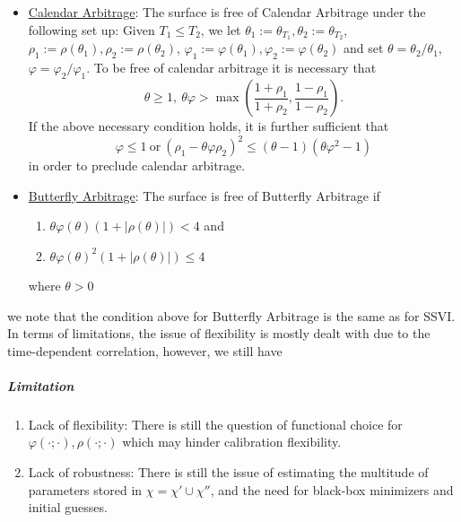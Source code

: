 \documentclass[11pt,letterpaper]{article}
\begin{document}
\begin{itemize}
\item \underline{Calendar Arbitrage}: The surface is free of Calendar Arbitrage under the following set up: Given $T_1 \leq T_2$, we let $\theta_1 := \theta_{T_1}, \theta_2 := \theta_{T_2}$, $\rho_1 := \rho(\theta_{1} ), \rho_2 := \rho(\theta_{2} )$, $\varphi_1 := \varphi(\theta_1), \varphi_2 := \varphi(\theta_2)$ and set $\theta = \theta_2/\theta_1$, $\varphi = \varphi_2/\varphi_1$. To be free of calendar arbitrage it is necessary that 
\[
\theta\geq 1  , \  \theta \varphi > \max\left( \frac{1 + \rho_1}{1 + \rho_2} , \frac{1 - \rho_1}{1 - \rho_2} \right).
\]
If the above necessary condition holds, it is further sufficient that
\begin{equation}
\varphi \leq 1 \ \text{or} \ (\rho_1 - \theta \varphi  \rho_2)^2 \leq ( \theta -1)(\theta \varphi^2 - 1) 
\label{eqn:eSSVIcalendar}
\end{equation}
in order to preclude calendar arbitrage. 
\item \underline{Butterfly Arbitrage}: The surface is free of Butterfly Arbitrage if 
\begin{enumerate}
\item $\theta \varphi(\theta) ( 1 + |\rho(\theta)| ) < 4 $ and
\item $\theta \varphi(\theta)^2 (1 + |\rho(\theta) | ) \leq 4 $
\end{enumerate}
where $\theta > 0$ 
\end{itemize}
we note that the condition above for Butterfly Arbitrage is the same as for SSVI. In terms of limitations, the issue of flexibility is mostly dealt with due to the time-dependent correlation, however, we still have 
\subparagraph{Limitation}
\begin{enumerate}
\item Lack of flexibility: There is still the question of functional choice for $\varphi(\cdot;\cdot), \rho(\cdot;\cdot)$ which may hinder calibration flexibility. 
\item Lack of robustness: There is still the issue of estimating the multitude of parameters stored in $\chi = \chi' \cup \chi''$, and the need for black-box minimizers and initial guesses. 
\end{enumerate}
\end{document}
